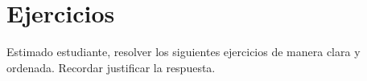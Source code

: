 \section*{\large Ejercicios}

Estimado estudiante, resolver los siguientes ejercicios de manera clara y ordenada. Recordar justificar la respuesta.
